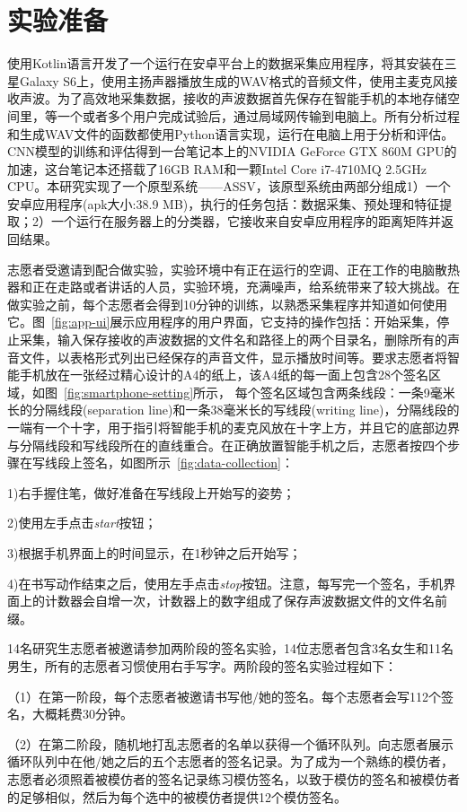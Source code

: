 \section{实验准备}
使用Kotlin语言开发了一个运行在安卓平台上的数据采集应用程序，将其安装在三星Galaxy S6上，使用主扬声器播放生成的WAV格式的音频文件，使用主麦克风接收声波。为了高效地采集数据，接收的声波数据首先保存在智能手机的本地存储空间里，等一个或者多个用户完成试验后，通过局域网传输到电脑上。所有分析过程和生成WAV文件的函数都使用Python语言实现，运行在电脑上用于分析和评估。CNN模型的训练和评估得到一台笔记本上的NVIDIA GeForce GTX 860M GPU的加速，这台笔记本还搭载了16GB RAM和一颗Intel Core i7-4710MQ 2.5GHz CPU。本研究实现了一个原型系统——ASSV，该原型系统由两部分组成1）一个安卓应用程序(apk大小:38.9 MB)，执行的任务包括：数据采集、预处理和特征提取；2）一个运行在服务器上的分类器，它接收来自安卓应用程序的距离矩阵并返回结果。

志愿者受邀请到配合做实验，实验环境中有正在运行的空调、正在工作的电脑散热器和正在走路或者讲话的人员，实验环境，充满噪声，给系统带来了较大挑战。在做实验之前，每个志愿者会得到10分钟的训练，以熟悉采集程序并知道如何使用它。图~\ref{fig:app-ui}展示应用程序的用户界面，它支持的操作包括：开始采集，停止采集，输入保存接收的声波数据的文件名和路径上的两个目录名，删除所有的声音文件，以表格形式列出已经保存的声音文件，显示播放时间等。要求志愿者将智能手机放在一张经过精心设计的A4的纸上，该A4纸的每一面上包含28个签名区域，如图~\ref{fig:smartphone-setting}所示，
每个签名区域包含两条线段：一条9毫米长的分隔线段(separation line)和一条38毫米长的写线段(writing line)，分隔线段的一端有一个十字，用于指引将智能手机的麦克风放在十字上方，并且它的底部边界与分隔线段和写线段所在的直线重合。在正确放置智能手机之后，志愿者按四个步骤在写线段上签名，如图所示~\ref{fig:data-collection}：

1)右手握住笔，做好准备在写线段上开始写的姿势；

2)使用左手点击\textit{start}按钮；

3)根据手机界面上的时间显示，在1秒钟之后开始写；

4)在书写动作结束之后，使用左手点击\textit{stop}按钮。注意，每写完一个签名，手机界面上的计数器会自增一次，计数器上的数字组成了保存声波数据文件的文件名前缀。

14名研究生志愿者被邀请参加两阶段的签名实验，14位志愿者包含3名女生和11名男生，所有的志愿者习惯使用右手写字。两阶段的签名实验过程如下：

（1）在第一阶段，每个志愿者被邀请书写他/她的签名。每个志愿者会写112个签名，大概耗费30分钟。

（2）在第二阶段，随机地打乱志愿者的名单以获得一个循环队列。向志愿者展示循环队列中在他/她之后的五个志愿者的签名记录。为了成为一个熟练的模仿者，志愿者必须照着被模仿者的签名记录练习模仿签名，以致于模仿的签名和被模仿者的足够相似，然后为每个选中的被模仿者提供12个模仿签名。

